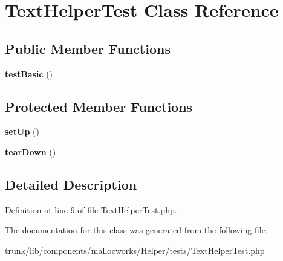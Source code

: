 \hypertarget{class_text_helper_test}{
\section{TextHelperTest Class Reference}
\label{class_text_helper_test}
}
\subsection*{Public Member Functions}
\begin{DoxyCompactItemize}
\item 
\hypertarget{class_text_helper_test_a43130cb481135ee931f1562a1503378a}{
{\bfseries testBasic} ()}
\label{class_text_helper_test_a43130cb481135ee931f1562a1503378a}

\end{DoxyCompactItemize}
\subsection*{Protected Member Functions}
\begin{DoxyCompactItemize}
\item 
\hypertarget{class_text_helper_test_a0bc688732d2b3b162ffebaf7812e78da}{
{\bfseries setUp} ()}
\label{class_text_helper_test_a0bc688732d2b3b162ffebaf7812e78da}

\item 
\hypertarget{class_text_helper_test_a80fe3d17e658907fc75346a0ec9d6fc7}{
{\bfseries tearDown} ()}
\label{class_text_helper_test_a80fe3d17e658907fc75346a0ec9d6fc7}

\end{DoxyCompactItemize}


\subsection{Detailed Description}


Definition at line 9 of file TextHelperTest.php.



The documentation for this class was generated from the following file:\begin{DoxyCompactItemize}
\item 
trunk/lib/components/mallocworks/Helper/tests/TextHelperTest.php\end{DoxyCompactItemize}

